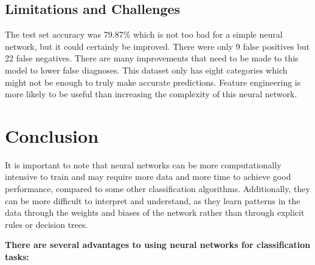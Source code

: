 \subsection{Limitations and Challenges}
\label{sec:limitation}
The test set accuracy was 79.87\% which is not too bad for
 a simple neural network, but it could certainly be improved.
  There were only 9 false positives but 22 false negatives.
   There are many improvements that need to be made to this model to 
   lower false diagnoses. This dataset only has eight categories
    which might not be enough to truly make accurate predictions.
     Feature engineering is more likely to be useful than increasing
      the complexity of this neural network.

\section{Conclusion}
\label{chap:conclusion}
It is important to note that neural networks can be more 
computationally intensive to train and may require more data and 
more time to achieve good performance, compared to some other
 classification algorithms. Additionally, they can be more difficult
  to interpret and understand, as they learn patterns in the data 
  through the weights and biases of 
the network rather than through explicit rules or decision trees.


\textbf{There are several advantages to using neural networks for classification tasks:
}
\newpage